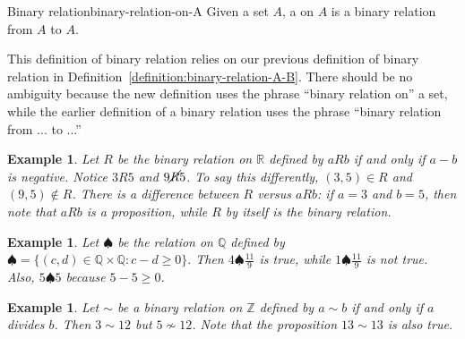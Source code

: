 \documentclass{book}
\newcounter{ekcounter}%
\theoremstyle{ekimcustom}
\newtheorem{example}[ekcounter]{Example}
\newcommand\defn[1]{{\color{blue}{\bf #1}}}
\begin{document}
\begin{bdefinition}{Binary relation}{binary-relation-on-A}
Given a set $A$, a \defn{binary relation} on $A$ is a binary relation from $A$ to $A$.
\end{bdefinition}
This definition of binary relation relies on our previous definition of binary relation in Definition~\ref{definition:binary-relation-A-B}. There should be no ambiguity because the new definition uses the phrase ``binary relation on'' a set, while the earlier definition of a binary relation uses the phrase ``binary relation from ... to ...''
\begin{example}\label{example:relation-less-than}
Let $R$ be the binary relation on $\mathbb{R}$ defined by $aRb$ if and only if $a-b$ is negative. Notice $3R5$ and $9\cancel{R}5$. To say this differently, $(3,5) \in R$ and $(9,5) \not\in R$. There is a difference between $R$ versus $aRb$: if $a=3$ and $b=5$, then note that $aRb$ is a proposition, while $R$ by itself is the binary relation.
\end{example}
\begin{example}\label{example:relation-geq}
Let $\spadesuit$ be the relation on $\mathbb{Q}$ defined by $\spadesuit = \{(c,d) \in \mathbb{Q} \times \mathbb{Q} : c - d \geq 0\}.$ Then $4 \spadesuit \frac{11}{9}$ is true, while $1 \spadesuit \frac{11}{9}$ is not true. Also, $5 \spadesuit 5$ because $5-5 \geq 0$.
\end{example}
\begin{example}\label{example:relation-divides}
Let $\sim$ be a binary relation on $\mathbb{Z}$ defined by $a \sim b$ if and only if $a$ divides $b$. Then $3 \sim 12$ but $5 \not\sim 12$. Note that the proposition $13 \sim 13$ is also true.
\end{example}
\end{document}
